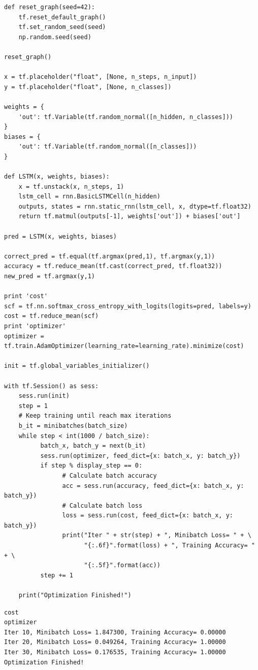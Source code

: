 \documentclass[12pt,fleqn]{article}\usepackage{../../common}
\begin{document}
\begin{verbatim}
def reset_graph(seed=42):
    tf.reset_default_graph()
    tf.set_random_seed(seed)
    np.random.seed(seed)

reset_graph()

x = tf.placeholder("float", [None, n_steps, n_input])
y = tf.placeholder("float", [None, n_classes])

weights = {
    'out': tf.Variable(tf.random_normal([n_hidden, n_classes]))
}
biases = {
    'out': tf.Variable(tf.random_normal([n_classes]))
}

def LSTM(x, weights, biases):
    x = tf.unstack(x, n_steps, 1)
    lstm_cell = rnn.BasicLSTMCell(n_hidden)
    outputs, states = rnn.static_rnn(lstm_cell, x, dtype=tf.float32)
    return tf.matmul(outputs[-1], weights['out']) + biases['out']

pred = LSTM(x, weights, biases)

correct_pred = tf.equal(tf.argmax(pred,1), tf.argmax(y,1))
accuracy = tf.reduce_mean(tf.cast(correct_pred, tf.float32))
new_pred = tf.argmax(y,1)

print 'cost'
scf = tf.nn.softmax_cross_entropy_with_logits(logits=pred, labels=y)
cost = tf.reduce_mean(scf)
print 'optimizer'
optimizer = tf.train.AdamOptimizer(learning_rate=learning_rate).minimize(cost)

init = tf.global_variables_initializer()

with tf.Session() as sess:
    sess.run(init)
    step = 1
    # Keep training until reach max iterations
    b_it = minibatches(batch_size)
    while step < int(1000 / batch_size):
          batch_x, batch_y = next(b_it)
          sess.run(optimizer, feed_dict={x: batch_x, y: batch_y})
          if step % display_step == 0:
                # Calculate batch accuracy
                acc = sess.run(accuracy, feed_dict={x: batch_x, y: batch_y})
                # Calculate batch loss
                loss = sess.run(cost, feed_dict={x: batch_x, y: batch_y})
                print("Iter " + str(step) + ", Minibatch Loss= " + \
                      "{:.6f}".format(loss) + ", Training Accuracy= " + \
                      "{:.5f}".format(acc))
          step += 1

    print("Optimization Finished!")
\end{verbatim}

\begin{verbatim}
cost
optimizer
Iter 10, Minibatch Loss= 1.847300, Training Accuracy= 0.00000
Iter 20, Minibatch Loss= 0.049264, Training Accuracy= 1.00000
Iter 30, Minibatch Loss= 0.176535, Training Accuracy= 1.00000
Optimization Finished!
\end{verbatim}
\end{document}
